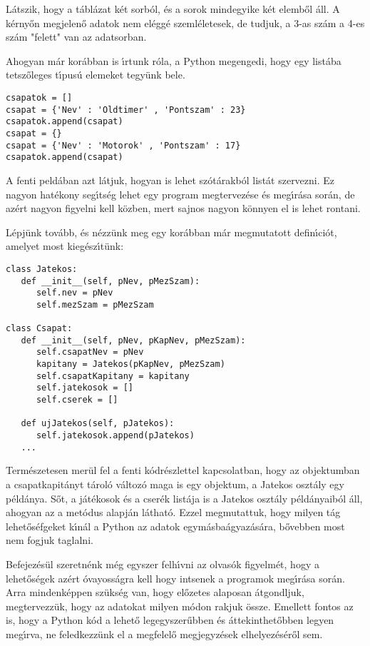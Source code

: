 L\'atszik, hogy a t\'abl\'azat k\'et sorb\'ol, \'es a sorok mindegyike k\'et elemb\H{o}l \'all. A k\'erny\H{o}n 
megjelen\H{o} adatok nem el\'egg\'e szeml\'eletesek, de tudjuk, a 3-as sz\'am a 4-es sz\'am "felett" van az 
adatsorban.

Ahogyan m\'ar kor\'abban is \'{\i}rtunk r\'ola, a Python megengedi, hogy egy list\'aba tetsz\H{o}leges 
t\'{\i}pus\'u elemeket tegy\"unk bele. 


\begin{Verbatim}[fontsize=\small]
csapatok = []
csapat = {'Nev' : 'Oldtimer' , 'Pontszam' : 23}
csapatok.append(csapat)
csapat = {}
csapat = {'Nev' : 'Motorok' , 'Pontszam' : 17}
csapatok.append(csapat)
\end{Verbatim}

A fenti peld\'aban azt l\'atjuk, hogyan is lehet sz\'ot\'arakb\'ol list\'at szervezni. Ez nagyon hat\'ekony 
seg\'{\i}ts\'eg lehet egy program megtervez\'ese \'es meg\'{\i}r\'asa sor\'an, de az\'ert nagyon figyelni kell 
k\"ozben, mert sajnos nagyon k\"onnyen el is lehet rontani.

L\'epj\"unk tov\'abb, \'es n\'ezz\"unk meg egy kor\'abban m\'ar megmutatott defin\'{\i}ci\'ot, amelyet most 
kieg\'esz\'{\i}t\"unk:

\begin{Verbatim}[fontsize=\small]
class Jatekos:
   def __init__(self, pNev, pMezSzam):
      self.nev = pNev
      self.mezSzam = pMezSzam

class Csapat:
   def __init__(self, pNev, pKapNev, pMezSzam):
      self.csapatNev = pNev
      kapitany = Jatekos(pKapNev, pMezSzam)
      self.csapatKapitany = kapitany
      self.jatekosok = []
      self.cserek = []

   def ujJatekos(self, pJatekos):
      self.jatekosok.append(pJatekos)
   ...
\end{Verbatim}

Term\'eszetesen mer\"ul fel a fenti k\'odr\'eszlettel kapcsolatban, hogy az objektumban a csapatkapit\'anyt 
t\'arol\'o v\'altoz\'o maga is egy objektum, a Jatekos oszt\'aly egy p\'eld\'anya. S\H{o}t, a j\'at\'ekosok 
\'es a cser\'ek list\'aja is a Jatekos oszt\'aly p\'eld\'anyaib\'ol \'all, ahogyan az a met\'odus alapj\'an 
l\'athat\'o. Ezzel megmutattuk, hogy milyen t\'ag lehet\H{o}s\'efgeket k\'{\i}n\'al a Python az adatok 
egym\'asba\'agyaz\'as\'ara, b\H{o}vebben most nem fogjuk taglalni. 

Befejez\'es\"ul szeretn\'enk m\'eg egyszer felh\'{\i}vni az olvas\'ok figyelm\'et, hogy  a lehet\H{o}s\'egek 
az\'ert \'ovayoss\'agra kell hogy intsenek a programok meg\'{\i}r\'asa sor\'an. Arra mindenk\'eppen sz\"uks\'eg 
van, hogy el\H{o}zetes alaposan \'atgondljuk, megtervezz\"uk, hogy az adatokat milyen m\'odon rakjuk \"ossze. 
Emellett fontos az is, hogy a Python k\'od a lehet\H{o} legegyszer\H{u}bben \'es \'attekinthet\H{o}bben legyen 
meg\'{\i}rva, ne feledkezz\"unk el a megfelel\H{o} megjegyz\'esek elhelyez\'es\'er\H{o}l sem.


